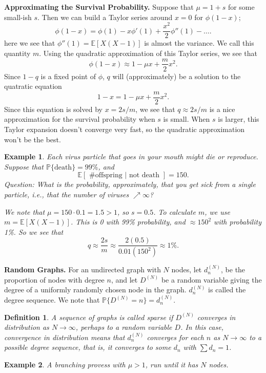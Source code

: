 \documentclass[12pt]{article}
\theoremstyle{plain}
\newtheorem*{example*}{Example}
\newtheorem*{definition*}{Definition}
\begin{document}
{\bf Approximating the Survival Probability.} Suppose that $\mu = 1 + s$ for some small-ish $s$. Then we can build a Taylor series around $x = 0$ for $\phi(1-x)$;
\[
\phi(1-x) = \phi(1) - x\phi'(1) + \frac{x^2}{2} \phi''(1) - \ldots.
\]
here we see that $\phi''(1) = \mathbb{E}[X(X-1)]$ is almost the variance. We call this quantity $m$. Using the quadratic approximation of this Taylor series, we see that
\[
\phi(1-x) \approx 1 - \mu x + \frac{m}{2} x^2.
\]
Since $1-q$ is a fixed point of $\phi$, $q$ will (approximately) be a solution to the quatratic equation
\[
1 - x = 1 - \mu x + \frac{m}{2} x^2.
\]
Since this equation is solved by $x = 2s/m$, we see that $q \approx 2s/m$ is a nice approximation for the survival probability when $s$ is small. When $s$ is larger, this Taylor expansion doesn't converge very fast, so the quadratic approximation won't be the best.

\begin{example*}
Each virus particle that goes in your mouth might die or reproduce. Suppose that $\mathbb{P}\{\text{death} \} = 99\%$, and 
\[
\mathbb{E}[ \text{ \# offspring } | \text{ not death }] = 150.
\]
Question: What is the probability, approximately, that you get sick from a single particle, i.e., that the number of viruses $\nearrow \infty$?

We note that $\mu = 150\cdot 0.1 = 1.5 > 1$, so $s = 0.5$. To calculate $m$, we use $m = \mathbb{E}[X(X-1)]$. This is 0 with 99\% probability, and $\approx 150^2$ with probability 1\%. So we see that
\[
q \approx \frac{2s}{m} \approx\frac{2(0.5)}{0.01(150^2)} \approx 1\%.
\]
\end{example*}

{\bf Random Graphs.} For an undirected graph with $N$ nodes, let $d_n^{(N)}$, be the proportion of nodes with degree $n$, and let $D^{(N)}$ be a random variable giving the degree of a uniformly randomly chosen node in the graph. $d_n^{(N)}$ is called the degree sequence. We note that $\mathbb{P}\{D^{(N)} = n\} = d_n^{(N)}$.

\begin{definition*} 
A sequence of graphs is called \emph{sparse} if $D^{(N)}$ converges in distribution as $N \rightarrow \infty$, perhaps to a random variable $D$. In this case, convergence in distribution means that $d_n^{(N)}$ converges for each $n$ as $N \rightarrow \infty$ to a possible degree sequence, that is, it converges to some $d_n$ with $\sum d_n = 1$.
\end{definition*} 

\begin{example*}
A branching provess with $\mu > 1$, run until it has $N$ nodes.
\end{example*}
\end{document}
